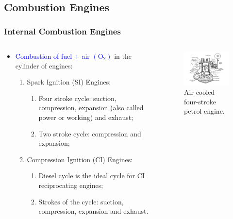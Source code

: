 \documentclass[10pt,compress]{beamer}
\begin{document}
\subsection{Combustion Engines}

\begin{frame}
 \frametitle{Internal Combustion Engines}
  \begin{columns}
   \begin{column}[c]{0.45\linewidth}
    \begin{itemize}
     \item <1-> \textcolor{blue}{Combustion of fuel + air $\left(\text{O}_{\text{2}}\right)$} in the cylinder of engines:
     \begin{enumerate}
      \item <2-> Spark Ignition (SI) Engines:
       \begin{enumerate}
        \item <4-> Four stroke cycle: suction, compression, expansion (also called power or working) and exhaust;
        \item <5-> Two stroke cycle: compression and expansion;
       \end{enumerate}
      \item <3-> Compression Ignition (CI) Engines: 
       \begin{enumerate}
          \item <6-> Diesel cycle is the ideal cycle for CI reciprocating engines;
          \item <7-> Strokes of the cycle: suction, compression, expansion and exhaust.
       \end{enumerate}
     \end{enumerate}
    \end{itemize}
   \end{column}
   \begin{column}[c]{0.55\linewidth}
    \begin{figure}%
     \begin{center}
      \includegraphics[width=7.5cm,clip]{./Pics/InternalCombustion_4Strokes}
      \caption{Air-cooled four-stroke petrol engine.}
     \end{center}
    \end{figure}  
   \end{column}  
  \end{columns}
\end{frame}
\end{document}
